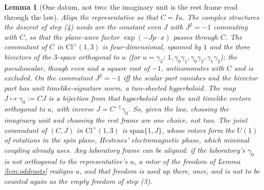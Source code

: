 \documentclass[11pt]{article}
\newtheorem{lemma}[theorem]{Lemma}
\theoremstyle{definition}
\newcommand{\Cl}{\mathrm{Cl}}
\begin{document}
\begin{lemma}[One datum, not two: the imaginary unit is the rest frame read through the law]\label{lem:onedatum}
Align the representative so that $C = Iu$. The complex structures the descent of step (4) needs are the constant even $J$ with $J^{2} = -1$ commuting with $C$, so that the plane-wave factor $\exp(-Jp \cdot x)$ passes through $C$. The commutant of $C$ in $\Cl^{+}(1,3)$ is four-dimensional, spanned by $1$ and the three bivectors of the $3$-space orthogonal to $u$ (for $u = \gamma_{3}$: $1, \gamma_{0}\gamma_{1}, \gamma_{0}\gamma_{2}, \gamma_{1}\gamma_{2}$); the pseudoscalar, though even and a square root of $-1$, anticommutes with $C$ and is excluded. On the commutant $J^{2} = -1$ iff the scalar part vanishes and the bivector part has unit timelike-signature norm, a two-sheeted hyperboloid. The map $J \mapsto \gamma_{0} := CJ$ is a bijection from that hyperboloid onto the unit timelike vectors orthogonal to $u$, with inverse $J = C^{-1}\gamma_{0}$. So, given the law, choosing the imaginary unit and choosing the rest frame are one choice, not two. The joint commutant of $(C, J)$ in $\Cl^{+}(1,3)$ is $\mathrm{span}\{1, J\}$, whose rotors form the $U(1)$ of rotations in the spin plane, Hestenes' electromagnetic phase, which minimal coupling already uses. Any laboratory frame can be aligned: if the laboratory's $\gamma_{0}$ is not orthogonal to the representative's $u$, a rotor of the freedom of Lemma \ref{lem:oddroots} realigns $u$, and that freedom is used up there, once, and is not to be counted again as the empty freedom of step (3).
\end{lemma}
\end{document}
